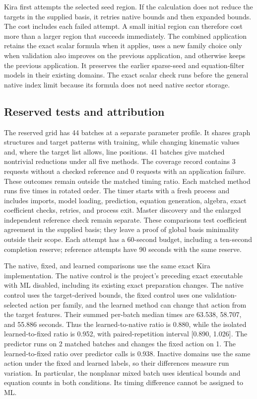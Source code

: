 Kira first attempts the selected seed region. If the calculation does not reduce the targets in the supplied basis, it retries native bounds and then expanded bounds. The cost includes each failed attempt. A small initial region can therefore cost more than a larger region that succeeds immediately. The combined application retains the exact scalar formula when it applies, uses a new family choice only when validation also improves on the previous application, and otherwise keeps the previous application. It preserves the earlier sparse-seed and equation-filter models in their existing domains. The exact scalar check runs before the general native index limit because its formula does not need native sector storage.

\subsection{Reserved tests and attribution}
The reserved grid has 44 batches at a separate parameter profile. It shares graph structures and target patterns with training, while changing kinematic values and, where the target list allows, line positions. 41 batches give matched nontrivial reductions under all five methods. The coverage record contains 3 requests without a checked reference and 0 requests with an application failure. These outcomes remain outside the matched timing ratio. Each matched method runs five times in rotated order. The timer starts with a fresh process and includes imports, model loading, prediction, equation generation, algebra, exact coefficient checks, retries, and process exit. Master discovery and the enlarged independent reference check remain separate. These comparisons test coefficient agreement in the supplied basis; they leave a proof of global basis minimality outside their scope. Each attempt has a 60-second budget, including a ten-second completion reserve; reference attempts have 90 seconds with the same reserve.

The native, fixed, and learned comparisons use the same exact Kira implementation. The native control is the project's preceding exact executable with ML disabled, including its existing exact preparation changes. The native control uses the target-derived bounds, the fixed control uses one validation-selected action per family, and the learned method can change that action from the target features. Their summed per-batch median times are 63.538, 58.707, and 55.886 seconds. Thus the learned-to-native ratio is 0.880, while the isolated learned-to-fixed ratio is 0.952, with paired-repetition interval [0.890, 1.026]. The predictor runs on 2 matched batches and changes the fixed action on 1. The learned-to-fixed ratio over predictor calls is 0.938. Inactive domains use the same action under the fixed and learned labels, so their differences measure run variation. In particular, the nonplanar mixed batch uses identical bounds and equation counts in both conditions. Its timing difference cannot be assigned to ML.

